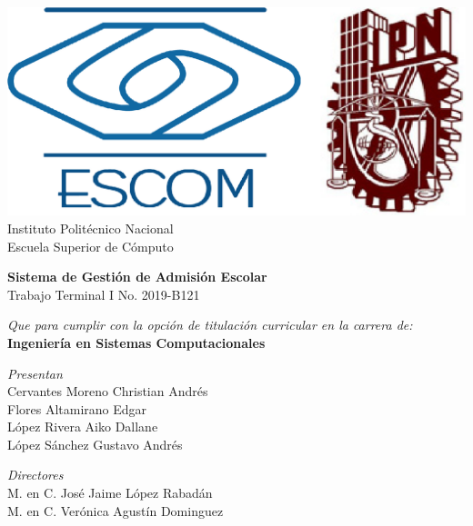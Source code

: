 
\begin{titlepage}

    \centering %

    \includegraphics[scale=0.17]{imagenes/escom-ipn} %
    \LARGE{\\ Instituto Polit\'ecnico Nacional}
    \LARGE{\\ Escuela Superior de C\'omputo}
    
    \vspace{1cm} %

    \LARGE \textbf{Sistema de Gesti\'on de Admisi\'on Escolar}
    \LARGE {\\Trabajo Terminal I No. 2019-B121}

    \vspace{1cm} %

    \LARGE \textit{Que para cumplir con la opción de titulaci\'on curricular en la carrera de:}
    \LARGE \textbf{\\ Ingenier\'ia en Sistemas Computacionales}

    \vspace{1cm} %

   \textit{Presentan}\\
    Cervantes Moreno Christian Andr\'es \\
    Flores Altamirano Edgar \\
    L\'opez Rivera Aiko Dallane \\
    L\'opez S\'anchez Gustavo Andr\'es

    \vspace{1cm} %

   \textit{Directores}\\
    M. en C. Jos\'e Jaime L\'opez Rabad\'an \\
    M. en C. Verónica Agustín Dominguez
    
    

\end{titlepage}